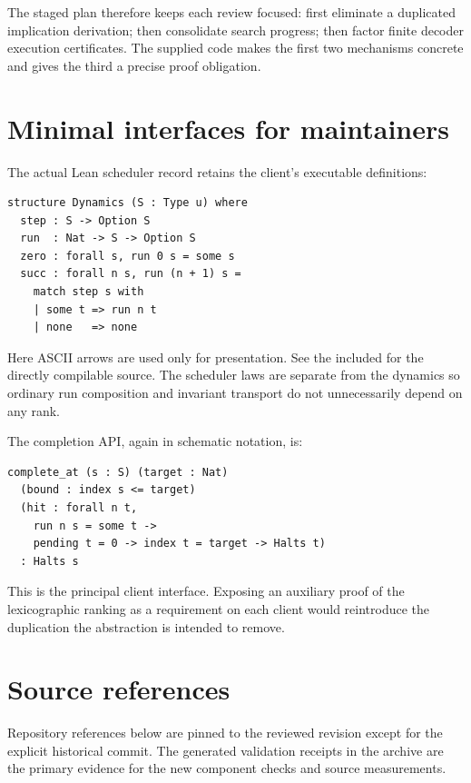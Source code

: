\documentclass[11pt]{article}
\newcommand{\code}[1]{\texttt{\detokenize{#1}}}
\begin{document}
The staged plan therefore keeps each review focused: first eliminate a
duplicated implication derivation; then consolidate search progress; then
factor finite decoder execution certificates. The supplied code makes the
first two mechanisms concrete and gives the third a precise proof obligation.

\clearpage
\appendix
\section{Minimal interfaces for maintainers}

The actual Lean scheduler record retains the client's executable definitions:
\begin{lstlisting}
structure Dynamics (S : Type u) where
  step : S -> Option S
  run  : Nat -> S -> Option S
  zero : forall s, run 0 s = some s
  succ : forall n s, run (n + 1) s =
    match step s with
    | some t => run n t
    | none   => none
\end{lstlisting}
Here ASCII arrows are used only for presentation. See the included
\code{CofinalScheduler.lean} for the directly compilable source. The scheduler
laws are separate from the dynamics so ordinary run composition and invariant
transport do not unnecessarily depend on any rank.

The completion API, again in schematic notation, is:
\begin{lstlisting}
complete_at (s : S) (target : Nat)
  (bound : index s <= target)
  (hit : forall n t,
    run n s = some t ->
    pending t = 0 -> index t = target -> Halts t)
  : Halts s
\end{lstlisting}
This is the principal client interface. Exposing an auxiliary proof of the
lexicographic ranking as a requirement on each client would reintroduce the
duplication the abstraction is intended to remove.

\section{Source references}

Repository references below are pinned to the reviewed revision except for the
explicit historical commit. The generated validation receipts in the archive
are the primary evidence for the new component checks and source measurements.
\end{document}
